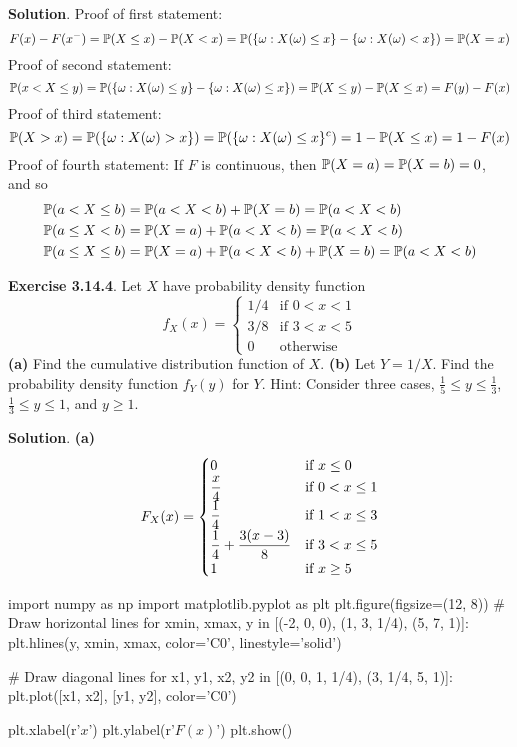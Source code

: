 \textbf{Solution}.
Proof of first statement:
\[
F(x) - F(x^{-}) = \operatorname{\mathbb{P}}(X \leq x) - \operatorname{\mathbb{P}}(X < x) = \operatorname{\mathbb{P}}(\{\omega : X(\omega) \leq x\} - \{\omega : X(\omega) < x\}) = \operatorname{\mathbb{P}}(X = x)
\]
Proof of second statement:
\[
\operatorname{\mathbb{P}}(x < X \leq y) = \operatorname{\mathbb{P}}(\{\omega : X(\omega) \leq y\} - \{\omega : X(\omega) \leq x\}) = \operatorname{\mathbb{P}}(X \leq y) - \operatorname{\mathbb{P}}(X \leq x) = F(y) - F(x)
\]
Proof of third statement:
\[
\operatorname{\mathbb{P}}(X > x) = \operatorname{\mathbb{P}}(\{\omega: X(\omega) > x\}) = \operatorname{\mathbb{P}}(\{\omega: X(\omega) \leq x\}^{c}) = 1 - \operatorname{\mathbb{P}}(X \leq x) = 1 - F(x)
\]
Proof of fourth statement:
If \(F\) is continuous, then
\(\operatorname{\mathbb{P}}(X = a) = \operatorname{\mathbb{P}}(X = b) = 0\), and so
\begin{align*}
\operatorname{\mathbb{P}}(a < X \leq b) 
&= \operatorname{\mathbb{P}}(a < X < b) + \operatorname{\mathbb{P}}(X = b) = \operatorname{\mathbb{P}}(a < X < b) 
\\
\operatorname{\mathbb{P}}(a \leq X < b) 
&= \operatorname{\mathbb{P}}(X = a) + \operatorname{\mathbb{P}}(a < X < b) = \operatorname{\mathbb{P}}(a < X < b) 
\\
\operatorname{\mathbb{P}}(a \leq X \leq b) 
&= \operatorname{\mathbb{P}}(X = a) + \operatorname{\mathbb{P}}(a < X < b) + \operatorname{\mathbb{P}}(X = b) 
 = \operatorname{\mathbb{P}}(a < X < b)
\end{align*}

\textbf{Exercise 3.14.4}. Let \(X\) have probability density function
\[
f_X(x) = 
\begin{cases}
1/4 &\text{if } 0 < x < 1 \\
3/8 &\text{if } 3 < x < 5 \\
0   &\text{otherwise}
\end{cases}
\]
\textbf{(a)} Find the cumulative distribution function of \(X\).
\textbf{(b)} Let \(Y = 1 / X\). Find the probability density function
\(f_Y(y)\) for \(Y\). Hint: Consider three cases,
\(\frac{1}{5} \leq y \leq \frac{1}{3}\), \(\frac{1}{3} \leq y \leq 1\),
and \(y \geq 1\).

\textbf{Solution}.
\textbf{(a)}
\[
F_X(x) = 
\begin{cases}
0 &\text{if } x \leq 0 \\
\displaystyle\frac{x}{4} &\text{if } 0 < x \leq 1 \\
\displaystyle\frac{1}{4} &\text{if } 1 < x \leq 3 \\
\displaystyle\frac{1}{4} + \frac{3(x - 3)}{8} &\text{if } 3 < x \leq 5 \\
1 &\text{if } x \geq 5
\end{cases} 
\]

\begin{python}
import numpy as np
import matplotlib.pyplot as plt
plt.figure(figsize=(12, 8))
# Draw horizontal lines
for xmin, xmax, y in [(-2, 0, 0), (1, 3, 1/4), (5, 7, 1)]:
    plt.hlines(y, xmin, xmax, color='C0', linestyle='solid')
    
# Draw diagonal lines
for x1, y1, x2, y2 in [(0, 0, 1, 1/4), (3, 1/4, 5, 1)]:
    plt.plot([x1, x2], [y1, y2], color='C0')
    
plt.xlabel(r'$x$')
plt.ylabel(r'$F(x)$')
plt.show()
\end{python}

